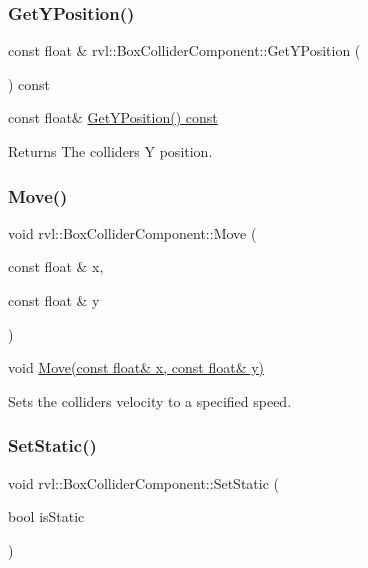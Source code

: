 \subsubsection{\texorpdfstring{Get\+Y\+Position()}{GetYPosition()}}
{\footnotesize\ttfamily const float \& rvl\+::\+Box\+Collider\+Component\+::\+Get\+Y\+Position (\begin{DoxyParamCaption}{ }\end{DoxyParamCaption}) const}



const float\& \hyperlink{classrvl_1_1_box_collider_component_ab21aca89c253235b2f33867c2b411467}{Get\+Y\+Position() const} 

\begin{DoxyReturn}{Returns}
The colliders Y position. 
\end{DoxyReturn}
\mbox{\label{classrvl_1_1_box_collider_component_a97acd0965e4dd2bfd281e1ee5db78135}} 
\subsubsection{\texorpdfstring{Move()}{Move()}}
{\footnotesize\ttfamily void rvl\+::\+Box\+Collider\+Component\+::\+Move (\begin{DoxyParamCaption}\item[{const float \&}]{x,  }\item[{const float \&}]{y }\end{DoxyParamCaption})}



void \hyperlink{classrvl_1_1_box_collider_component_a97acd0965e4dd2bfd281e1ee5db78135}{Move(const float\& x, const float\& y)} 

Sets the colliders velocity to a specified speed. \mbox{\label{classrvl_1_1_box_collider_component_aaa7a7e7213f89532aa0b8a311ff264f8}} 
\subsubsection{\texorpdfstring{Set\+Static()}{SetStatic()}}
{\footnotesize\ttfamily void rvl\+::\+Box\+Collider\+Component\+::\+Set\+Static (\begin{DoxyParamCaption}\item[{bool}]{is\+Static }\end{DoxyParamCaption})}



